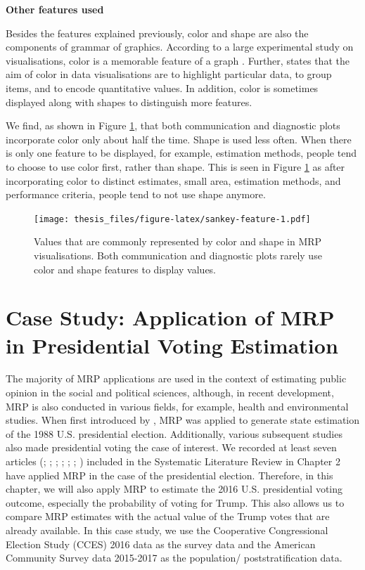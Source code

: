\documentclass{monashthesis}
\begin{document}
\textbf{Other features used}

Besides the features explained previously, color and shape are also the components of grammar of graphics. According to a large experimental study on visualisations, color is a memorable feature of a graph \autocite{MIDWAY2020100141}. Further, \textcite{few_2008} states that the aim of color in data visualisations are to highlight particular data, to group items, and to encode quantitative values. In addition, color is sometimes displayed along with shapes to distinguish more features.

We find, as shown in Figure \ref{fig:sankey-feature}, that both communication and diagnostic plots incorporate color only about half the time. Shape is used less often. When there is only one feature to be displayed, for example, estimation methods, people tend to choose to use color first, rather than shape. This is seen in Figure \ref{fig:sankey-feature} as after incorporating color to distinct estimates, small area, estimation methods, and performance criteria, people tend to not use shape anymore.

\begin{figure}
\centering
\texttt{[image: thesis\_files/figure-latex/sankey-feature-1.pdf]}
\caption{\label{fig:sankey-feature}Values that are commonly represented by color and shape in MRP visualisations. Both communication and diagnostic plots rarely use color and shape features to display values.}
\end{figure}

\hypertarget{ch:case-stud}{%
\chapter{Case Study: Application of MRP in Presidential Voting Estimation}\label{ch:case-stud}}

The majority of MRP applications are used in the context of estimating public opinion in the social and political sciences, although, in recent development, MRP is also conducted in various fields, for example, health and environmental studies. When first introduced by \textcite{Gelman97poststratificationinto}, MRP was applied to generate state estimation of the 1988 U.S. presidential election. Additionally, various subsequent studies also made presidential voting the case of interest. We recorded at least seven articles (\textcite{GelmanAndrew2014HBAC}; \textcite{GhitzaYair2013DIwM}; \textcite{KiewietdeJongeChadP2018PSPE}; \textcite{LauderdaleBenjaminE2020Mppf}; \textcite{LeiRayleigh2017T2EA}; \textcite{ParkDavidK2004BMEw}; \textcite{WangWei2015Fewn}) included in the Systematic Literature Review in Chapter 2 have applied MRP in the case of the presidential election. Therefore, in this chapter, we will also apply MRP to estimate the 2016 U.S. presidential voting outcome, especially the probability of voting for Trump. This also allows us to compare MRP estimates with the actual value of the Trump votes that are already available. In this case study, we use the Cooperative Congressional Election Study (CCES) 2016 data \autocite{cces_data} as the survey data and the American Community Survey data 2015-2017 \autocite{acs_data} as the population/ poststratification data.
\end{document}
